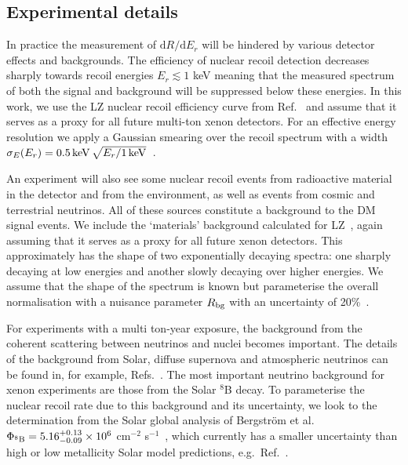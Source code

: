 \documentclass[prd,10pt,twocolumn,showpacs,nofootinbib,aps,superscriptaddress,preprintnumbers]{revtex4-1}
\begin{document}
 \subsection{Experimental details}\label{subsec:expdetails}
 
In practice the measurement of $\textrm{d}R/\textrm{d}E_r$ will be
hindered by various detector effects and backgrounds. 
The efficiency of nuclear
recoil detection decreases sharply towards recoil energies $E_r\lesssim1$ keV
meaning that the measured spectrum of both the signal and
background will be suppressed below these energies. In this work, we use the LZ
nuclear recoil efficiency curve from Ref.~\cite{Akerib:2018lyp} and assume that it serves as a proxy for all future multi-ton
xenon detectors. For an effective energy resolution we apply a Gaussian smearing over the recoil spectrum with a width $\sigma_E(E_r) =  0.5\, {\rm keV}\,\sqrt{E_r/1\,{\rm keV}}$~\cite{Schumann:2015cpa}. 

An experiment will also see some nuclear recoil events from radioactive 
material in the detector and from the environment, 
as well as events from cosmic and terrestrial neutrinos. All of these sources constitute a background
to the DM signal events. We include the `materials' background calculated for
LZ~\cite{Akerib:2018lyp}, again assuming that it serves as a proxy for all future xenon detectors. 
This approximately has the shape of two exponentially decaying spectra: 
one sharply decaying at low energies and another slowly decaying over higher energies. 
We assume that the shape of the spectrum is known but
parameterise the overall normalisation with a nuisance parameter
$R_{\rm bg}$ with an uncertainty of 20\%~\cite{Akerib:2018lyp}.

For experiments with a multi ton-year exposure, the background from the coherent scattering between
neutrinos and nuclei becomes important. The
details of the background from Solar, diffuse supernova and
atmospheric neutrinos can be found in, for example,
Refs.~\cite{Billard:2013qya,Ruppin:2014bra,OHare:2016pjy}. The most
important neutrino background for xenon experiments are those from the
Solar $^8$B decay. To parameterise the nuclear recoil rate due to this
background and its uncertainty, we look to the determination from the
Solar global analysis of Bergstr\"om et al. $\Phi_{^8{\rm B}} =
5.16^{+0.13}_{-0.09} \times 10^6$ cm$^{-2}$
s$^{-1}$~\cite{Bergstrom:2016cbh}, which currently has a smaller
uncertainty than high or low metallicity Solar model predictions,
e.g.\ Ref.~\cite{Vinyoles:2016djt}.
\end{document}
